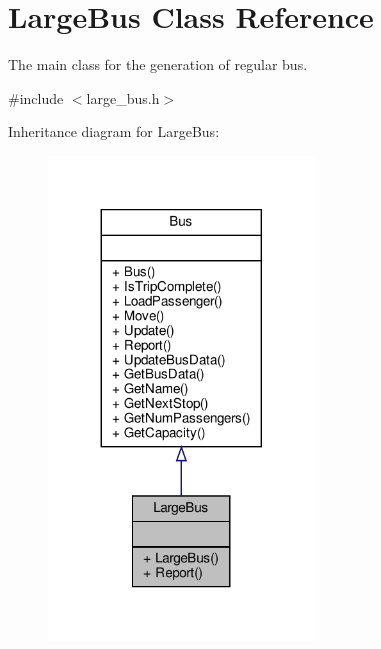 \hypertarget{classLargeBus}{}\section{Large\+Bus Class Reference}
\label{classLargeBus}


The main class for the generation of regular bus.  




{\ttfamily \#include $<$large\+\_\+bus.\+h$>$}



Inheritance diagram for Large\+Bus\+:
\nopagebreak
\begin{figure}[H]
\begin{center}
\leavevmode
\includegraphics[width=200pt]{classLargeBus__inherit__graph}
\end{center}
\end{figure}


